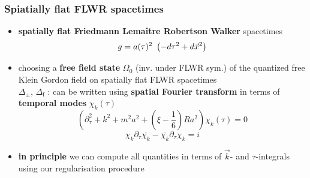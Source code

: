 \documentclass[9pt]{beamer}
\newcommand{\fsf}{\mathsf{f}}
\begin{document}
\begin{frame}
 
\frametitle{Spiatially flat FLWR spacetimes} 
 


\begin{itemize}
 
 
\item \textbf{spatially flat Friedmann Lemaître Robertson Walker} spacetimes
\vspace*{-12pt}
\begin{equation*}
g = a(\tau)^2 \ \left( - d\tau^2 + d\vec{x}^2 \right) 
\vspace*{-8pt}
\end{equation*}

 
\item choosing a \textbf{free field state} $\Omega_0$ (inv. under FLWR sym.) of the quantized free Klein Gordon field on spatially flat FLWR spacetimes \\
$\Delta_\pm$, $\Delta_\fsf$ : can be written using \textbf{spatial Fourier transform} in terms of \textbf{temporal modes} $\chi_k(\tau)$
\vspace*{-6pt}
\begin{equation*}
\left( \partial^2_\tau + k^2 + m^2a^2 + \left( \xi - \frac16 \right)Ra^2 \right) \chi_k(\tau) = 0 
\end{equation*}
\begin{equation*}
\chi_k \partial_\tau \overline{\chi_k} - \overline{\chi_k} \partial_\tau {\chi_k} =i 
\end{equation*}

\item \textbf{in principle} we can compute all quantities in terms of $\vec{k}$- and $\tau$-integrals using our regularisation procedure 
  
\end{itemize}
 
\end{frame}

\end{document}
